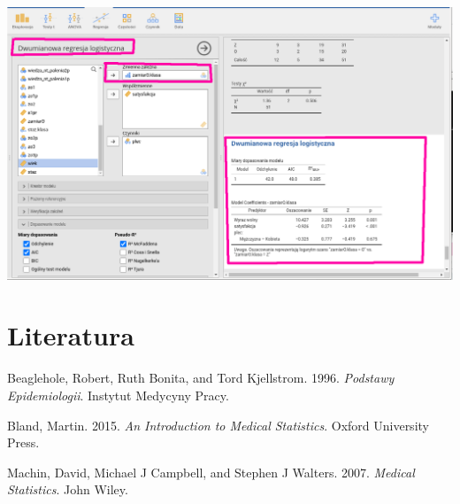 \documentclass[
  openany]{book}
\begin{document}
\includegraphics{./regresja_logistyczna.png}

\hypertarget{literatura}{%
\chapter{Literatura}\label{literatura}}

Beaglehole, Robert, Ruth Bonita, and Tord Kjellstrom. 1996. \emph{Podstawy Epidemiologii}. Instytut Medycyny Pracy.

Bland, Martin. 2015. \emph{An Introduction to Medical Statistics}. Oxford University Press.

Machin, David, Michael J Campbell, and Stephen J Walters. 2007. \emph{Medical Statistics}. John Wiley.
\end{document}
